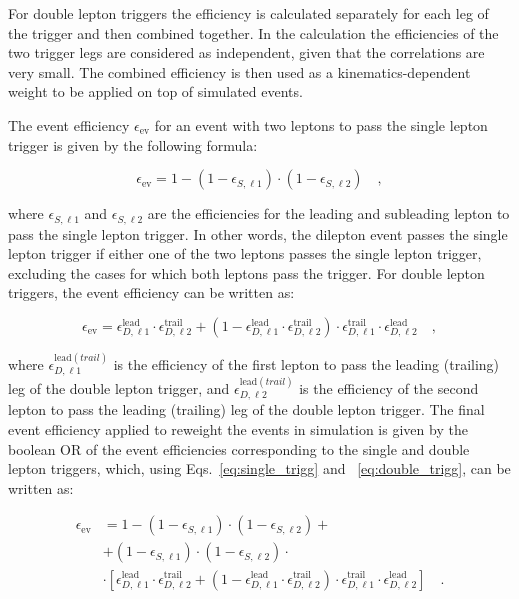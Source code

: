 For double lepton triggers the efficiency is calculated separately for each leg of the trigger and then combined together. In the calculation the efficiencies of the two trigger legs are considered as independent, given that the correlations are very small. The combined efficiency is then used as a kinematics-dependent weight to be applied on top of simulated events.

The event efficiency $\epsilon_\mathrm{ev}$ for an event with two leptons to pass the single lepton trigger is given by the following formula:

\begin{equation}\label{eq:single_trigg}
\epsilon_\mathrm{ev} = 1 - (1-\epsilon_{S,\ell1})\cdot(1-\epsilon_{S,\ell2})\quad,
\end{equation}

where $\epsilon_{S,\ell1}$ and $\epsilon_{S,\ell2}$ are the efficiencies for the leading and subleading lepton to pass the single lepton trigger. In other words, the dilepton event passes the single lepton trigger if either one of the two leptons passes the single lepton trigger, excluding the cases for which both leptons pass the trigger. For double lepton triggers, the event efficiency can be written as:

\begin{equation}\label{eq:double_trigg}
\epsilon_\mathrm{ev}  = \epsilon_{D,\ell1}^\mathrm{lead} \cdot \epsilon_{D,\ell2}^\mathrm{trail} + (  1 -  \epsilon_{D,\ell1}^\mathrm{lead} \cdot \epsilon_{D,\ell2}^\mathrm{trail})\cdot\epsilon_{D,\ell1}^\mathrm{trail} \cdot \epsilon_{D,\ell2}^\mathrm{lead} \quad,
\end{equation}

where $\epsilon_{D,\ell1}^{\mathrm{lead}(trail)}$ is the efficiency of the first lepton to pass the leading (trailing) leg of the double lepton trigger, and $\epsilon_{D,\ell2}^{\mathrm{lead}(trail)}$ is the efficiency of the second lepton to pass the leading (trailing) leg of the double lepton trigger. The final event efficiency applied to reweight the events in simulation is given by the boolean OR of the event efficiencies corresponding to the single and double lepton triggers, which, using Eqs.~\eqref{eq:single_trigg} and ~\eqref{eq:double_trigg}, can be written as:

\begin{equation}
\begin{split}
\epsilon_\mathrm{ev} & = 1 - (1-\epsilon_{S,\ell1})\cdot(1-\epsilon_{S,\ell2}) + \\
                     & + (1-\epsilon_{S,\ell1})\cdot(1-\epsilon_{S,\ell2}) \cdot \\
                     & \cdot [ \epsilon_{D,\ell1}^\mathrm{lead} \cdot \epsilon_{D,\ell2}^\mathrm{trail} + (  1 -  \epsilon_{D,\ell1}^\mathrm{lead} \cdot \epsilon_{D,\ell2}^\mathrm{trail})\cdot\epsilon_{D,\ell1}^\mathrm{trail} \cdot \epsilon_{D,\ell2}^\mathrm{lead} ] \quad.
\end{split}
\end{equation}

